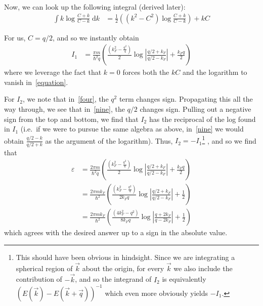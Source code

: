 \documentclass[12pt]{article}
\newcommand{\abs}[1]{\left|#1\right|}
\begin{document}
Now, we can look up the following integral (derived later):
\begin{align}
    \int k \log \frac{C+k}{C-k}\;\mathrm{d}k &= \frac{1}{2} \left(
        \left( k^2 - C^2 \right)\log \frac{C+k}{C-k}
    \right) + kC\label{equation}
\end{align}

For us, $C = q/2$, and so we instantly obtain
\begin{align}
    I_1 &= \frac{\pi m}{\hbar^2 q} \left(
        \frac{\left( k_F^2 - \frac{q^2}{4} \right)}{2}
        \log \abs{\frac{q/2+k_F}{q/2-k_F}} + \frac{k_F q}{2}
    \right)
\end{align}
where we leverage the fact that $k=0$ forces both the $kC$ and the logarithm to
vanish in~\eqref{equation}.

For $I_2$, we note that in~\eqref{four}, the $q^2$ term changes sign.
Propagating this all the way through, we see that in~\eqref{nine}, the
$q/2$ changes sign. Pulling out a negative sign from the top and bottom, we find
that $I_2$ has the reciprocal of the log found in $I_1$ (i.e.\ if we were to
pursue the same algebra as above, in~\eqref{nine} we would obtain
$\frac{q/2-k}{q/2+k}$ as the argument of the logarithm). Thus, $I_2 = -I_1$\footnote
    {This should have been obvious in hindsight. Since we are integrating a
    spherical region of $\vec{k}$ about the origin, for every $\vec{k}$ we also
    include the contribution of $-\vec{k}$, and so the integrand of $I_2$ is
    equivalently $\left( E(\vec{k}) - E(\vec{k} + \vec{q}) \right)^{-1}$ which
    even more obviously yields $-I_1$.}
, and
so we find that
\begin{align}
    \varepsilon &= \frac{2\pi m}{\hbar^2 q} \left(
        \frac{\left( k_F^2 - \frac{q^2}{4} \right)}{2}
        \log \abs{\frac{q/2+k_F}{q/2-k_F}} + \frac{k_F q}{2}
    \right)\\
    &= \frac{2\pi m k_F}{\hbar^2} \left(
        \frac{\left( k_F^2 - \frac{q^2}{4} \right)}{2k_Fq}
        \log \abs{\frac{q/2+k_F}{q/2-k_F}} + \frac{1}{2}
    \right)\\
    &= \frac{2\pi m k_F}{\hbar^2} \left(
        \frac{\left( 4k_F^2 - q^2 \right)}{8k_Fq}
        \log \abs{\frac{q+2k_F}{q-2k_F}} + \frac{1}{2}
    \right)
\end{align}
which agrees with the desired answer up to a sign in the absolute value.
\end{document}
